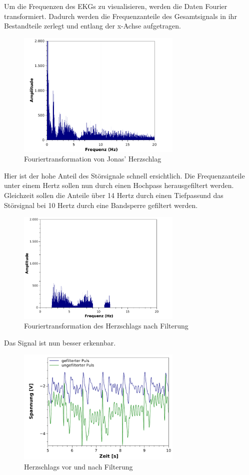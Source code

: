 Um die Frequenzen des EKGs zu visualisieren, werden die Daten Fourier transformiert.
Dadurch werden die Frequenzanteile des Gesamtsignals in ihr Bestandteile zerlegt
und entlang der x-Achse aufgetragen.
\begin{figure}[H]
	\centering
	\includegraphics[width=0.7\textwidth]{Mess/Ekg/jonas_nofft.pdf}
	\caption{Fouriertransformation von Jonas' Herzschlag}
	\label{jonfftnofilter}
\end{figure}
Hier ist der hohe Anteil des Störsignale schnell ersichtlich.
Die Frequenzanteile unter einem Hertz sollen nun durch einen Hochpass herausgefiltert werden.
Gleichzeit sollen die Anteile über 14 Hertz durch einen Tiefpassund das Störsignal bei
10 Hertz durch eine Bandsperre gefiltert werden.
\begin{figure}[H]
	\centering
	\includegraphics[width=0.7\textwidth]{Mess/Ekg/jonas_fft.pdf}
	\caption{Fouriertransformation des Herzschlags nach Filterung}
	\label{jonfft}
\end{figure}
Das Signal ist nun besser erkennbar.
\begin{figure}[H]
	\centering
	\includegraphics[width=0.7\textwidth]{Mess/Ekg/jonas_filter.pdf}
	\caption{Herzschlags vor und nach Filterung}
	\label{jonfilter}
\end{figure}
